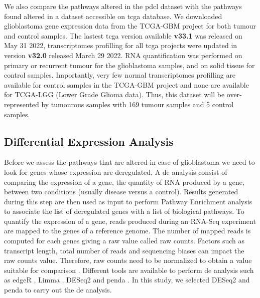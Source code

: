 We also compare the pathways altered in the \acrshort{pdcl} dataset with the pathways found altered in a dataset accessible on \acrshort{tcga} database. 
We downloaded glioblastoma gene expression data from the TCGA-GBM project for both tumour and control samples.
The lastest \acrshort{tcga} version available \textbf{v33.1} was released on May 31 2022, transcriptomes profilling for all \acrshort{tcga} projects were updated in version \textbf{v32.0} released March 29 2022.
RNA quantification was performed on primary or recurrent tumour for the glioblastoma samples, and on solid tissue for control samples.
Importantly, very few normal transcriptomes profilling are available for control samples in the TCGA-GBM project and none are available for TCGA-LGG (Lower Grade Glioma data).
Thus, this dataset will be over-represented by tumourous samples with 169 tumour samples and 5 control samples.

\subsection{Differential Expression Analysis}

Before we assess the pathways that are altered in case of glioblastoma we need to look for genes whose expression are deregulated.
A \acrfull{de} analysis consist of comparing the expression of a gene, the quantity of RNA produced by a gene, between two conditions (usually disease versus a control).
Results generated during this step are then used as input to perform Pathway Enrichment analysis to associate the list of deregulated genes with a list of biological pathways.
To quantify the expression of a gene, reads produced during an RNA-Seq experiment are mapped to the genes of a reference genome.
The number of mapped reads is computed for each genes giving a raw value called raw counts.
Factors such as transcript length, total number of reads and sequencing biases can impact the raw counts value. 
Therefore, raw counts need to be normalized to obtain a value suitable for comparison \cite*{Conesa2016}.
Different tools are available to perform \acrshort{de} analysis such as edgeR \cite*{Robinson2010}, Limma \cite*{Ritchie2015}, DESeq2 \cite*{Love2014} and \acrshort{penda} \cite*{Richard2020}.
In this study, we selected DESeq2 \cite*{Love2014} and \acrfull{penda} to carry out the \acrshort{de} analysis.

